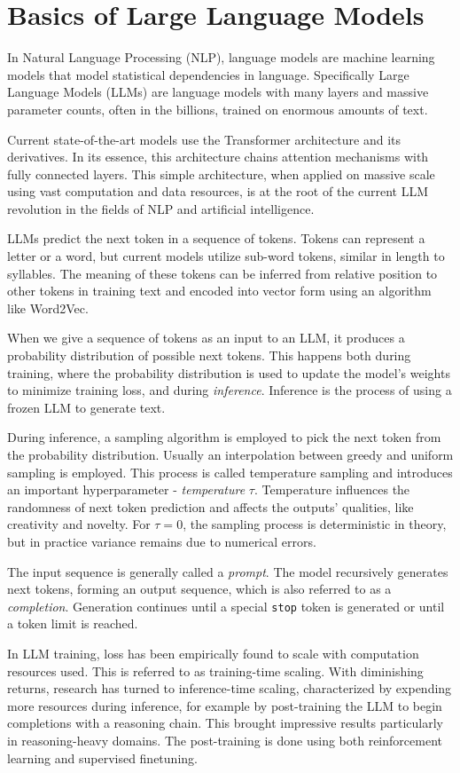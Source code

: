 \section{Basics of Large Language Models}
In Natural Language Processing (NLP), language models are machine learning models that model statistical dependencies in language.
Specifically Large Language Models (LLMs) are language models with many layers and massive parameter counts, often in the billions, trained on enormous amounts of text.

Current state-of-the-art models use the Transformer\cite{vaswani2023attentionneed} architecture and its derivatives. 
In its essence, this architecture chains attention mechanisms with fully connected layers. 
This simple architecture, when applied on massive scale using vast computation and data resources, is at the root of the current LLM revolution in the fields of NLP and artificial intelligence.

LLMs predict the next token in a sequence of tokens. Tokens can represent a letter or a word, but current models utilize sub-word tokens, similar in length to syllables.
The meaning of these tokens can be inferred from relative position to other tokens in training text and encoded into vector form using an algorithm like Word2Vec\cite{mikolov2013efficientestimationwordrepresentations}.

When we give a sequence of tokens as an input to an LLM, it produces a probability distribution of possible next tokens. 
This happens both during training, where the probability distribution is used to update the model's weights to minimize training loss, and during \textit{inference}.
Inference is the process of using a frozen LLM to generate text. 

During inference, a sampling algorithm is employed to pick the next token from the probability distribution.
Usually an interpolation between greedy and uniform sampling is employed. This process is called temperature sampling and introduces an important hyperparameter - \textit{temperature} $\tau$.
Temperature influences the randomness of next token prediction and affects the outputs' qualities, like creativity and novelty. 
For $\tau = 0$, the sampling process is deterministic in theory, but in practice variance remains due to numerical errors.

The input sequence is generally called a \textit{prompt}. The model recursively generates next tokens, forming an output sequence, which is also referred to as a \textit{completion}.
Generation continues until a special \texttt{stop} token is generated or until a token limit is reached.

In LLM training, loss has been empirically found to scale with computation resources used\cite{kaplan2020scalinglawsneurallanguage}. This is referred to as training-time scaling.
With diminishing returns, research has turned to inference-time scaling, characterized by expending more resources during inference, for example by post-training the LLM to begin completions
with a reasoning chain. This brought impressive results particularly in reasoning-heavy domains. The post-training is done using both reinforcement learning and supervised finetuning.